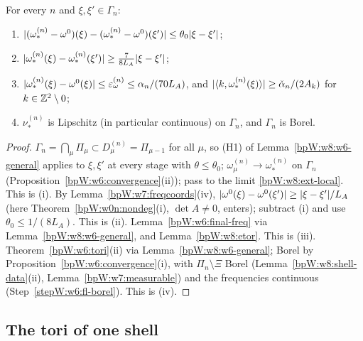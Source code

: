 \begin{lemma}\label{bpW:w8:freq-shell}
For every $n$ and $\xi,\xi'\in\Gamma_n$:
\begin{enumerate}[label=(\roman*)]
\item $\lvert (\omega^{(n)}_*-\omega^0)(\xi)-(\omega^{(n)}_*-\omega^0)(\xi')\rvert\le\theta_0\lvert \xi-\xi'\rvert$;
\item $\lvert \omega^{(n)}_*(\xi)-\omega^{(n)}_*(\xi')\rvert\ge\frac7{8L_A}\lvert \xi-\xi'\rvert$;
\item $\lvert \omega^{(n)}_*(\xi)-\omega^0(\xi)\rvert\le\varepsilon^{(n)}_\omega\le\alpha_n/(70L_A)$, and
  $\lvert \langle k,\omega^{(n)}_*(\xi)\rangle\rvert\ge\check\alpha_n/(2A_k)$ for $k\in\mathbb{Z}^2\setminus0$;
\item $\nu^{(n)}_*$ is Lipschitz (in particular continuous) on $\Gamma_n$, and $\Gamma_n$ is Borel.
\end{enumerate}
\end{lemma}
\begin{proof}
\label{stepW:w8:fs-lim} $\Gamma_n=\bigcap_\mu\Pi_\mu\subset D^{(n)}_\mu=\Pi_{\mu-1}$ for all $\mu$, so (H1) of
Lemma~\ref{bpW:w8:w6-general} applies to $\xi,\xi'$ at every stage with $\theta\le\theta_0$; $\omega^{(n)}_\mu\to\omega^{(n)}_*$ on $\Gamma_n$
(Proposition~\ref{bpW:w6:convergence}(ii)); pass to the limit \ref{bpW:w8:ext-local}. This is (i).
\label{stepW:w8:fs-low} By Lemma~\ref{bpW:w7:freqcoords}(iv), $\lvert \omega^0(\xi)-\omega^0(\xi')\rvert\ge\lvert \xi-\xi'\rvert/L_A$
(here Theorem~\ref{bpW:w0n:nondeg}(i), $\det A\neq0$, enters); subtract (i) and use $\theta_0\le1/(8L_A)$. This is (ii).
\label{stepW:w8:fs-size} Lemma~\ref{bpW:w6:final-freq} via Lemma~\ref{bpW:w8:w6-general}, and
Lemma~\ref{bpW:w8:etor}. This is (iii).
\label{stepW:w8:fs-reg} Theorem~\ref{bpW:w6:tori}(ii) via Lemma~\ref{bpW:w8:w6-general}; Borel by
Proposition~\ref{bpW:w6:convergence}(i), with $\Pi_n\setminus\Xi$ Borel (Lemma~\ref{bpW:w8:shell-data}(ii), Lemma~\ref{bpW:w7:measurable})
and the frequencies continuous (Step~\ref{stepW:w6:fl-borel}). This is (iv).
\end{proof}

\subsection{The tori of one shell}\label{bpW:w8:tori-sec}

